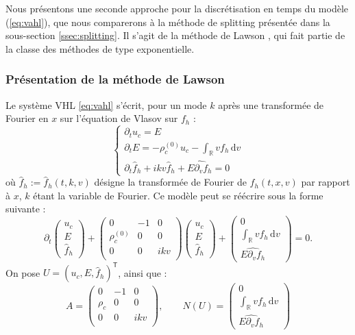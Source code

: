 Nous présentons une seconde approche pour la discrétisation en temps du modèle (\ref{eq:vahl}), que nous comparerons à la méthode de splitting présentée dans la sous-section \ref{ssec:splitting}. Il s'agit de la méthode de Lawson \cite{Lawson:1967}, qui fait partie de la classe des méthodes de type exponentielle.

\subsubsection{Présentation de la méthode de Lawson}

Le système VHL \eqref{eq:vahl} s'écrit, pour un mode $k$ après une transformée de Fourier en $x$ sur l'équation de Vlasov sur $f_h$ :
\begin{equation}
  \begin{cases}
    \partial_t u_c = E \\
    \partial_t E = -\rho_c^{(0)}u_c - \int_\mathbb{R} vf_h\,\mathrm{d}v \\
    \partial_t \hat{f}_h + ikv \hat{f}_h + \widehat{E\partial_vf_h} = 0
  \end{cases}
  \label{eq:vahlfft}
\end{equation}
où $\hat{f}_h:= \hat{f}_h(t, k, v)$ désigne la transformée de Fourier de $f_h(t, x,v)$ par rapport à $x$, $k$ étant la variable de Fourier. Ce modèle peut se réécrire sous la forme suivante :
$$
  \partial_t\begin{pmatrix} u_c \\ E \\ \hat{f}_h \end{pmatrix}
  + \begin{pmatrix}
    0            & -1 & 0   \\
    \rho_c^{(0)} &  0 & 0   \\
    0            &  0 & ikv \\
  \end{pmatrix}\begin{pmatrix} u_c \\ E \\ \hat{f}_h \end{pmatrix}
  + \begin{pmatrix} 0 \\ \int_\mathbb{R} vf_h\,\mathrm{d}v \\ \widehat{E\partial_vf_h} \end{pmatrix}
  = 0. 
$$
On pose $U =\left(u_c , E , \hat{f}_h\right)^{\textsf{T}}$, ainsi que :
$$
  A = \begin{pmatrix}0 & -1 & 0 \\ \rho_c & 0 & 0 \\ 0 & 0 & ikv \\ \end{pmatrix},\qquad N(U) = \begin{pmatrix} 0 \\ \int_\mathbb{R} vf_h\,\mathrm{d}v \\ \widehat{E\partial_vf_h} \end{pmatrix}
$$
